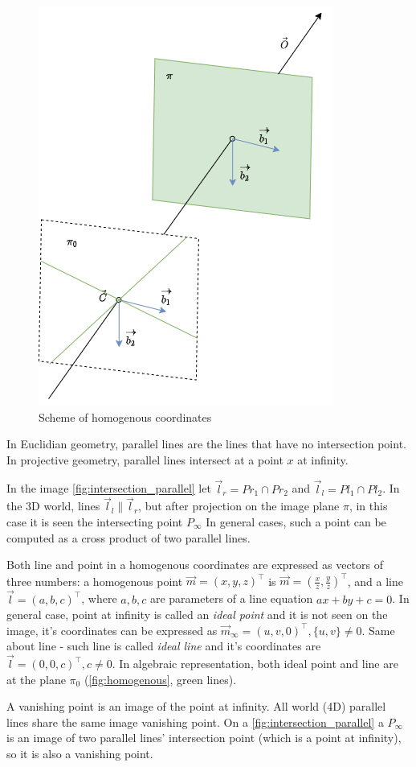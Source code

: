 \begin{figure}[h]
    \centering
    \includegraphics[width=.5\textwidth]{graphics/homogenous.png}
    \caption{Scheme of homogenous coordinates}
    \label{fig:homogenous}
\end{figure}

In Euclidian geometry, parallel lines are the lines that have no intersection point. 
In projective geometry, parallel lines intersect at a point $x$ at infinity. 

In the image \autoref{fig:intersection_parallel} let $\vec{l}_r = Pr_1 \cap Pr_2 $ and $\vec{l}_l = Pl_1 \cap Pl_2$. 
In the 3D world, lines $\vec{l}_l \parallel \vec{l}_r$, but after projection on the image plane $\pi$, in this case it is seen the intersecting point $P_{\infty}$
In general cases, such a point can be computed as a cross product of two parallel lines. 

Both line and point in a homogenous coordinates are expressed as vectors of three numbers: a homogenous point $\vec{m} = (x, y, z)^\top$ is $\vec{m} = (\frac{x}{z}, \frac{y}{z})^\top$, and a line $\vec{l} = (a, b, c)^\top$, where $a, b, c$ are parameters of a line equation $ax + by + c = 0$. 
In general case, point at infinity is called an \textit{ideal point} and it is not seen on the image, it's coordinates can be expressed as $\vec{m}_{\infty} = (u, v, 0)^\top, \{u, v\} \neq 0$.
Same about line - such line is called \textit{ideal line} and it's coordinates are $\vec{l} = (0, 0, c)^\top, c \neq 0$. In algebraic representation, both ideal point and line are at the plane $\pi_0$ (\autoref{fig:homogenous}, green lines).

A vanishing point is an image of the point at infinity.
All world (4D) parallel lines share the same image vanishing point. On a \autoref{fig:intersection_parallel} a $P_{\infty}$ is an image of two parallel lines' intersection point (which is a point at infinity), so it is also a vanishing point.

